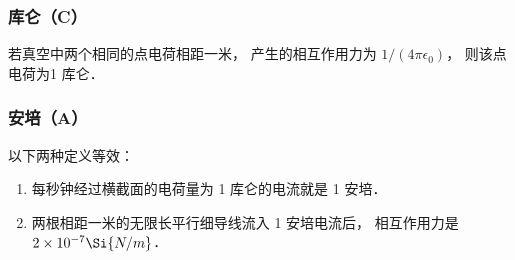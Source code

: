 \subsubsection{库仑（C）}
若真空中两个相同的点电荷相距一米， 产生的相互作用力为 $1/(4\pi\epsilon_0)$，   则该点电荷为1 库仑．

\subsubsection{安培（A）}
以下两种定义等效：
\begin{enumerate}
\item 每秒钟经过横截面的电荷量为 1 库仑的电流就是 1 安培．
\item 两根相距一米的无限长平行细导线流入 1 安培电流后， 相互作用力是 $2 \times 10^{-7}\Si{N/m}$． 
\end{enumerate}



